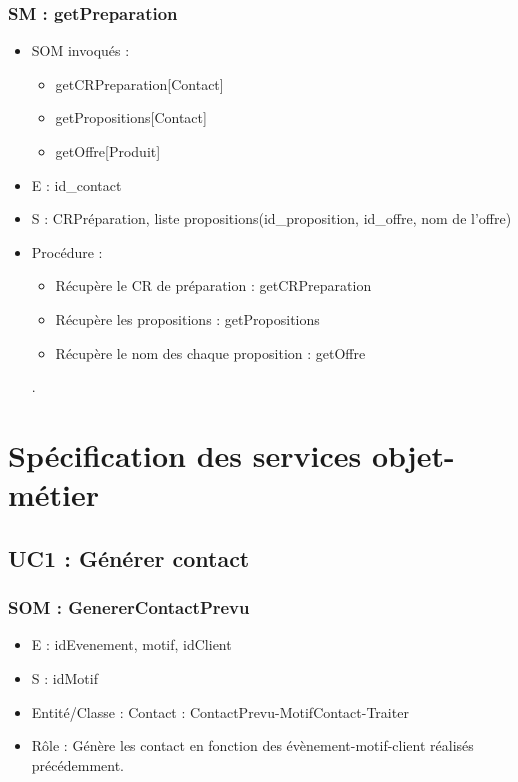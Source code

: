 \subsubsection{SM : getPreparation}
\begin{itemize}
	\item SOM invoqués :
	\begin{itemize}
		\item getCRPreparation[Contact]
		\item getPropositions[Contact]
		\item getOffre[Produit]
	\end{itemize}
	\item E : id\_contact
	\item S : CRPréparation, liste propositions(id\_proposition, id\_offre, nom de l’offre)
	\item Procédure :
	\begin{itemize}
		\item Récupère le CR de préparation : getCRPreparation
		\item Récupère les propositions : getPropositions
		\item Récupère le nom des chaque proposition : getOffre
	\end{itemize}.
\end{itemize}



\section{Spécification des services objet-métier}
\subsection{UC1 : Générer contact}
\subsubsection{SOM : GenererContactPrevu}
	\begin{itemize}
		\item E : idEvenement, motif, idClient
		\item S : idMotif
		\item Entité/Classe : Contact : ContactPrevu-MotifContact-Traiter
		\item Rôle : Génère les contact en fonction des évènement-motif-client réalisés
	précédemment.
	\end{itemize}



